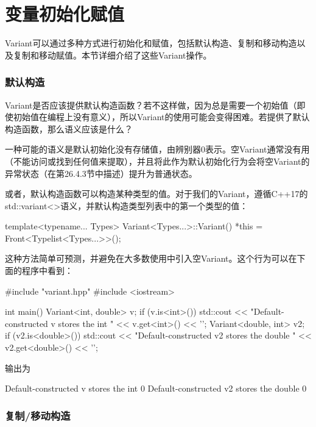 \section{变量初始化赋值}
Variant可以通过多种方式进行初始化和赋值，包括默认构造、复制和移动构造以及复制和移动赋值。本节详细介绍了这些Variant操作。

\subsubsection{默认构造}

Variant是否应该提供默认构造函数？若不这样做，因为总是需要一个初始值（即使初始值在编程上没有意义），所以Variant的使用可能会变得困难。若提供了默认构造函数，那么语义应该是什么？

一种可能的语义是默认初始化没有存储值，由辨别器0表示。空Variant通常没有用（不能访问或找到任何值来提取），并且将此作为默认初始化行为会将空Variant的异常状态（在第26.4.3节中描述）提升为普通状态。

或者，默认构造函数可以构造某种类型的值。对于我们的Variant，遵循C++17的std::variant<>语义，并默认构造类型列表中的第一个类型的值：

\begin{cpp}
template<typename... Types>
Variant<Types...>::Variant() {
	*this = Front<Typelist<Types...>>();
}
\end{cpp}

这种方法简单可预测，并避免在大多数使用中引入空Variant。这个行为可以在下面的程序中看到：

\begin{cpp}
#include "variant.hpp"
#include <iostream>

int main() {
	Variant<int, double> v;
	if (v.is<int>()) {
		std::cout << "Default-constructed v stores the int "
		<< v.get<int>() << '\n';
	}
	Variant<double, int> v2;
	if (v2.is<double>()) {
		std::cout << "Default-constructed v2 stores the double "
				<< v2.get<double>() << '\n';
	}
}
\end{cpp}

输出为

\begin{shell}
Default-constructed v stores the int 0
Default-constructed v2 stores the double 0
\end{shell}

\subsubsection{复制/移动构造}

